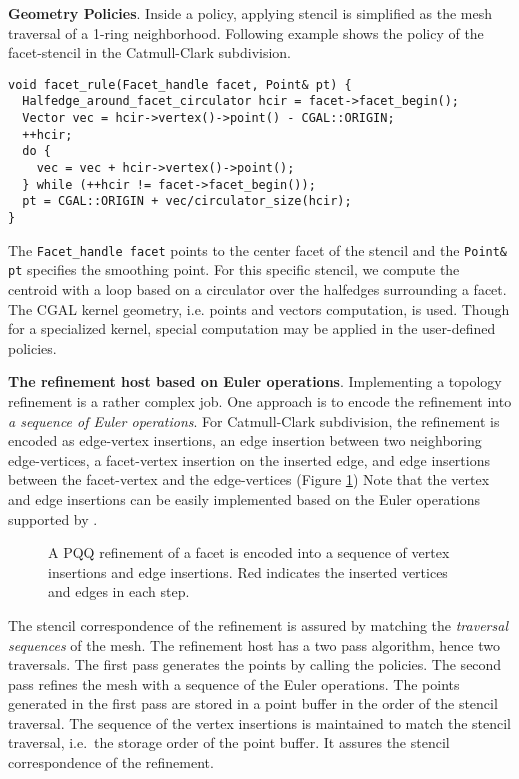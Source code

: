 \noindent\textbf{Geometry Policies}.
Inside a policy, applying stencil is simplified as 
the mesh traversal of a 1-ring neighborhood. 
Following example shows the policy of the facet-stencil 
in the Catmull-Clark subdivision.
\begin{lstlisting}
void facet_rule(Facet_handle facet, Point& pt) {
  Halfedge_around_facet_circulator hcir = facet->facet_begin();
  Vector vec = hcir->vertex()->point() - CGAL::ORIGIN;
  ++hcir;
  do {
    vec = vec + hcir->vertex()->point();
  } while (++hcir != facet->facet_begin());
  pt = CGAL::ORIGIN + vec/circulator_size(hcir);
}
\end{lstlisting}
The \lstinline!Facet_handle facet! points to the 
center facet of the stencil and the \lstinline!Point& pt! 
specifies the smoothing point. For this specific stencil, 
we compute the centroid with a loop based on a circulator 
over the halfedges surrounding a facet. The CGAL kernel 
geometry, i.e. points and vectors computation, is used. 
Though for a specialized kernel, special computation may be 
applied in the user-defined policies.
 
\noindent\textbf{The refinement host based on Euler operations}.
Implementing a topology refinement is a rather complex job. One
approach is to encode the refinement into \emph{a sequence of Euler
operations}. For Catmull-Clark subdivision, the refinement is encoded
as edge-vertex insertions, an edge insertion between two neighboring
edge-vertices, a facet-vertex insertion on the inserted edge, and 
edge insertions between the facet-vertex and the edge-vertices 
(Figure \ref{fig:CCRefinement}) 
Note that the vertex and edge insertions can be easily 
implemented based on the Euler operations supported by \cgalpoly.
\begin{figure}
  \centering
  \caption{A PQQ refinement of a facet is encoded into a sequence of
  vertex insertions and edge insertions. Red indicates the inserted
  vertices and edges in each step.}
  \label{fig:CCRefinement}
\end{figure}

The stencil correspondence of the refinement is assured
by matching the \emph{traversal sequences} of the mesh. 
The refinement host has a two pass algorithm, hence two 
traversals. The first pass generates the points by 
calling the policies. The second pass
refines the mesh with a sequence of the Euler operations.
The points generated in the first pass are stored in a
point buffer in the order of the stencil 
traversal. The sequence of the vertex insertions 
is maintained to match the stencil traversal, i.e.\ 
the storage order of the point buffer. It assures 
the stencil correspondence of the refinement.


